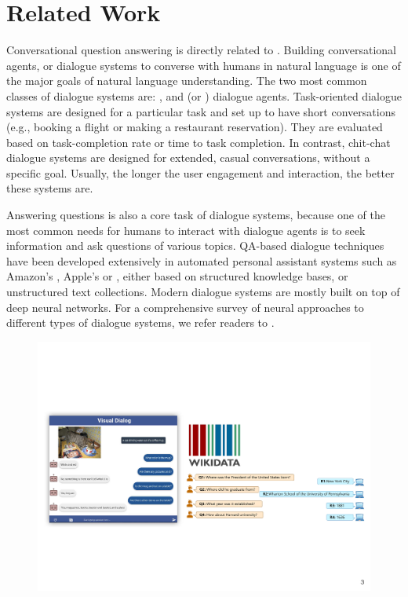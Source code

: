 
\section{Related Work}
\label{sec:coqa-rw}

Conversational question answering is directly related to . Building conversational agents, or dialogue systems to converse with humans in natural language is one of the major goals of natural language understanding. The two most common classes of dialogue systems are: , and  (or ) dialogue agents.  Task-oriented dialogue systems are designed for a particular task and set up to have short conversations (e.g., booking a flight or making a restaurant reservation). They are evaluated based on task-completion rate or time to task completion. In contrast, chit-chat dialogue systems are designed for extended, casual conversations, without a specific goal. Usually, the longer the user engagement and interaction, the better these systems are.

Answering questions is also a core task of dialogue systems, because one of the most common needs for humans to interact with dialogue agents is to seek information and ask questions of various topics. QA-based dialogue techniques have been developed extensively in automated personal assistant systems such as Amazon's , Apple's  or , either based on structured knowledge bases, or unstructured text collections. Modern dialogue systems are mostly built on top of deep neural networks. For a comprehensive survey of neural approaches to different types of dialogue systems, we refer readers to \cite{gao2018neural}.

\begin{figure}[!t]
    \center
    \includegraphics[scale=0.45]{img/other_coqa_tasks.pdf}
\end{figure}


